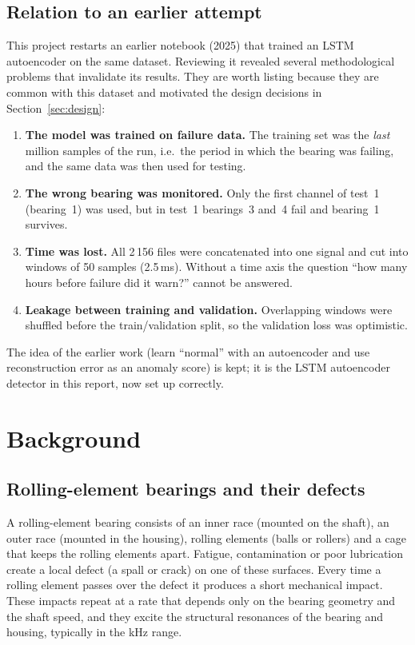 \documentclass[11pt]{article}
\begin{document}
\subsection{Relation to an earlier attempt}
This project restarts an earlier notebook (2025) that trained an LSTM autoencoder on the same dataset.
Reviewing it revealed several methodological problems that invalidate its results. They are worth
listing because they are common with this dataset and motivated the design decisions in
Section~\ref{sec:design}:
\begin{enumerate}
  \item \textbf{The model was trained on failure data.} The training set was the \emph{last} million
        samples of the run, i.e.\ the period in which the bearing was failing, and the same data was
        then used for testing.
  \item \textbf{The wrong bearing was monitored.} Only the first channel of test~1 (bearing~1) was
        used, but in test~1 bearings~3 and~4 fail and bearing~1 survives.
  \item \textbf{Time was lost.} All 2\,156 files were concatenated into one signal and cut into windows
        of 50 samples (2.5\,ms). Without a time axis the question ``how many hours before failure did
        it warn?'' cannot be answered.
  \item \textbf{Leakage between training and validation.} Overlapping windows were shuffled before the
        train/validation split, so the validation loss was optimistic.
\end{enumerate}
The idea of the earlier work (learn ``normal'' with an autoencoder and use reconstruction error as an
anomaly score) is kept; it is the LSTM autoencoder detector in this report, now set up correctly.

\section{Background}

\subsection{Rolling-element bearings and their defects}
A rolling-element bearing consists of an inner race (mounted on the shaft), an outer race (mounted in
the housing), rolling elements (balls or rollers) and a cage that keeps the rolling elements apart.
Fatigue, contamination or poor lubrication create a local defect (a spall or crack) on one of these
surfaces. Every time a rolling element passes over the defect it produces a short mechanical impact.
These impacts repeat at a rate that depends only on the bearing geometry and the shaft speed, and they
excite the structural resonances of the bearing and housing, typically in the kHz range.
\end{document}
